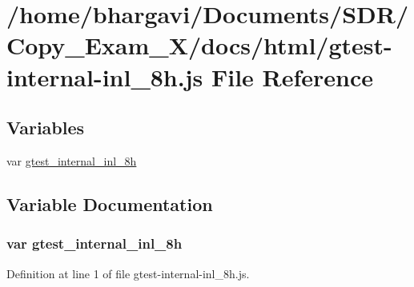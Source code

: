 \hypertarget{gtest-internal-inl__8h_8js}{}\section{/home/bhargavi/\+Documents/\+S\+D\+R/\+Copy\+\_\+\+Exam\+\_\+X/docs/html/gtest-\/internal-\/inl\+\_\+8h.js File Reference}
\label{gtest-internal-inl__8h_8js}
\subsection*{Variables}
\begin{DoxyCompactItemize}
\item 
var \hyperlink{gtest-internal-inl__8h_8js_a5b1c6c5d929b48b1757d69521cdea6c5}{gtest\+\_\+internal\+\_\+inl\+\_\+8h}
\end{DoxyCompactItemize}


\subsection{Variable Documentation}
\subsubsection[{\texorpdfstring{gtest\+\_\+internal\+\_\+inl\+\_\+8h}{gtest_internal_inl_8h}}]{\setlength{\rightskip}{0pt plus 5cm}var gtest\+\_\+internal\+\_\+inl\+\_\+8h}\hypertarget{gtest-internal-inl__8h_8js_a5b1c6c5d929b48b1757d69521cdea6c5}{}\label{gtest-internal-inl__8h_8js_a5b1c6c5d929b48b1757d69521cdea6c5}


Definition at line 1 of file gtest-\/internal-\/inl\+\_\+8h.\+js.

